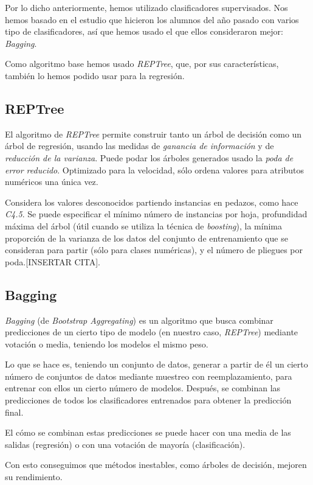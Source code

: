 Por lo dicho anteriormente, hemos utilizado clasificadores supervisados. Nos hemos basado en el estudio que hicieron los alumnos del año pasado con varios tipo de clasificadores, así que hemos usado el que ellos consideraron mejor: \textit{Bagging}.

Como algoritmo base hemos usado \textit{REPTree}, que, por sus características, también lo hemos podido usar para la regresión.

\subsection{REPTree}
El algoritmo de \textit{REPTree} permite construir tanto un árbol de decisión como un árbol de regresión, usando las medidas de \textit{ganancia de información} y de \textit{reducción de la varianza}. Puede podar los árboles generados usado la \textit{poda de error reducido}. Optimizado para la velocidad, sólo ordena valores para atributos numéricos una única vez.

Considera los valores desconocidos partiendo instancias en pedazos, como hace \textit{C4.5}. Se puede especificar el mínimo número de instancias por hoja, profundidad máxima del árbol (útil cuando se utiliza la técnica de \textit{boosting}), la mínima proporción de la varianza de los datos del conjunto de entrenamiento que se consideran para partir (sólo para clases numéricas), y el número de pliegues por poda.[INSERTAR CITA].

\subsection{Bagging}
\textit{Bagging} (de \textit{Bootstrap Aggregating}) es un algoritmo que busca combinar predicciones de un cierto tipo de modelo (en nuestro caso, \textit{REPTree}) mediante votación o media, teniendo los modelos el mismo peso.

Lo que se hace es, teniendo un conjunto de datos, generar a partir de él un cierto número de conjuntos de datos mediante muestreo con reemplazamiento, para entrenar con ellos un cierto número de modelos. Después, se combinan las predicciones de todos los clasificadores entrenados para obtener la predicción final.

El cómo se combinan estas predicciones se puede hacer con una media de las salidas (regresión) o con una votación de mayoría (clasificación).

Con esto conseguimos que métodos inestables, como árboles de decisión, mejoren su rendimiento.



